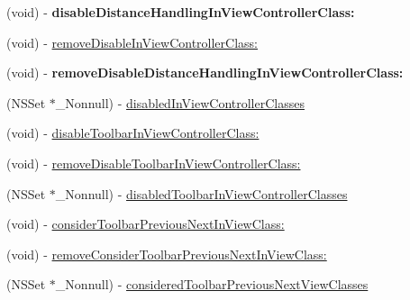 \begin{Indent}
\begin{DoxyCompactItemize}
\mbox{\label{interface_i_q_keyboard_manager_a9ceb61d3bd983a030f9c65cd1b8152c8}} 
(void) -\/ {\bfseries disable\+Distance\+Handling\+In\+View\+Controller\+Class\+:}
\item 
(void) -\/ \mbox{\hyperlink{interface_i_q_keyboard_manager_a816df2d7f4896490aba75e0e4172aca8}{remove\+Disable\+In\+View\+Controller\+Class\+:}}
\item 
\mbox{\label{interface_i_q_keyboard_manager_add246a2457d7aa32b4808f8682f66f8d}} 
(void) -\/ {\bfseries remove\+Disable\+Distance\+Handling\+In\+View\+Controller\+Class\+:}
\item 
(N\+S\+Set $\ast$\+\_\+\+Nonnull) -\/ \mbox{\hyperlink{interface_i_q_keyboard_manager_a3549c4c0b46b18854a0c3467276c0e3a}{disabled\+In\+View\+Controller\+Classes}}
\item 
(void) -\/ \mbox{\hyperlink{interface_i_q_keyboard_manager_ab613a813f64570cb4c10e03887356692}{disable\+Toolbar\+In\+View\+Controller\+Class\+:}}
\item 
(void) -\/ \mbox{\hyperlink{interface_i_q_keyboard_manager_a71d38785360ac94f27319b3bf9119d9e}{remove\+Disable\+Toolbar\+In\+View\+Controller\+Class\+:}}
\item 
(N\+S\+Set $\ast$\+\_\+\+Nonnull) -\/ \mbox{\hyperlink{interface_i_q_keyboard_manager_a4ddc098b0159752d9e935ceb97fe7f8c}{disabled\+Toolbar\+In\+View\+Controller\+Classes}}
\item 
(void) -\/ \mbox{\hyperlink{interface_i_q_keyboard_manager_a2d970d5680770d6aaced62a822b31958}{consider\+Toolbar\+Previous\+Next\+In\+View\+Class\+:}}
\item 
(void) -\/ \mbox{\hyperlink{interface_i_q_keyboard_manager_acd8d803c2aaaeab1204c709d81875a26}{remove\+Consider\+Toolbar\+Previous\+Next\+In\+View\+Class\+:}}
\item 
(N\+S\+Set $\ast$\+\_\+\+Nonnull) -\/ \mbox{\hyperlink{interface_i_q_keyboard_manager_a53372abfa157904c7e17dd8b5b544b09}{considered\+Toolbar\+Previous\+Next\+View\+Classes}}
\end{DoxyCompactItemize}
\end{Indent}
